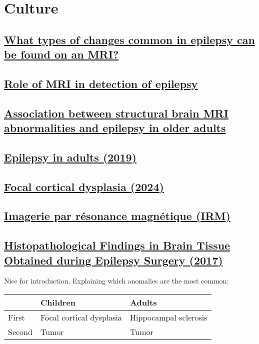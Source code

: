 \chapter{Culture}

\section{\href{https://www.epilepsy.com/diagnosis/brain-imaging/mri}{What types of changes common in epilepsy can be found on an MRI?}}

\section{\href{https://radiologyassistant.nl/neuroradiology/epilepsy/role-of-mri}{Role of MRI in detection of epilepsy}}

\section{\href{https://onlinelibrary.wiley.com/doi/10.1002/acn3.51955}{Association between structural brain MRI abnormalities and epilepsy in older adults}}

\section{\href{https://www.sciencedirect.com/science/article/abs/pii/S0140673618325960}{Epilepsy in adults (2019)}}

\section{\href{https://radiopaedia.org/articles/focal-cortical-dysplasia}{Focal cortical dysplasia (2024)}}

\section{\href{https://info-radiologie.ch/resonance_magnetique.php}{Imagerie par résonance magnétique (IRM)}}

\section{\href{https://www.nejm.org/doi/10.1056/NEJMoa1703784}{Histopathological Findings in Brain Tissue Obtained during Epilepsy Surgery (2017)}}

Nice for introduction. Explaining which anomalies are the most common: 

\begin{tabular}{l|ll}
	& Children & Adults \\
	\hline
	First & Focal cortical dysplasia & Hippocampal sclerosis \\
	Second & Tumor & Tumor \\
\end{tabular}

